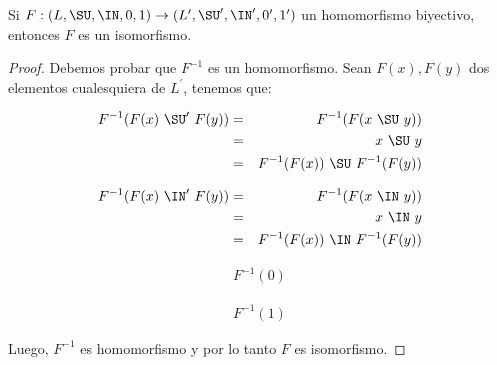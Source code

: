   \begin{lemma}
    \PN Si $F: (L, \SU, \IN, 0, 1) \rightarrow (L^{\prime}, \SU^{\prime}, \IN^{\prime}, 0^{\prime}, 1^{\prime})$ un
    homomorfismo biyectivo, entonces $F$ es un isomorfismo.
  \end{lemma}
  \begin{proof}
      \PN Debemos probar que $F^{-1}$ es un homomorfismo. Sean $F(x), F(y)$ dos elementos cualesquiera de $L^{\prime}$,
      tenemos que:
      \begin{multicols}{2}
        \begin{eqnarray*}
          F^{-1}(F(x) \ \SU^{\prime} \ F(y)) &=& F^{-1}(F(x \ \SU \ y)) \\
          &=& x \ \SU \ y \\
          &=& F^{-1}(F(x)) \ \SU \ F^{-1}(F(y))
        \end{eqnarray*}

        \begin{eqnarray*}
          F^{-1}(F(x) \ \IN^{\prime} \ F(y)) &=& F^{-1}(F(x \ \IN \ y)) \\
          &=& x \ \IN \ y \\
          &=& F^{-1}(F(x)) \ \IN \ F^{-1}(F(y))
        \end{eqnarray*}

        \begin{eqnarray*}
          F^{-1}(0)
        \end{eqnarray*}

        \begin{eqnarray*}
          F^{-1}(1)
        \end{eqnarray*}
      \end{multicols}

      \PN Luego, $F^{-1}$ es homomorfismo y por lo tanto $F$ es isomorfismo.
  \end{proof}

